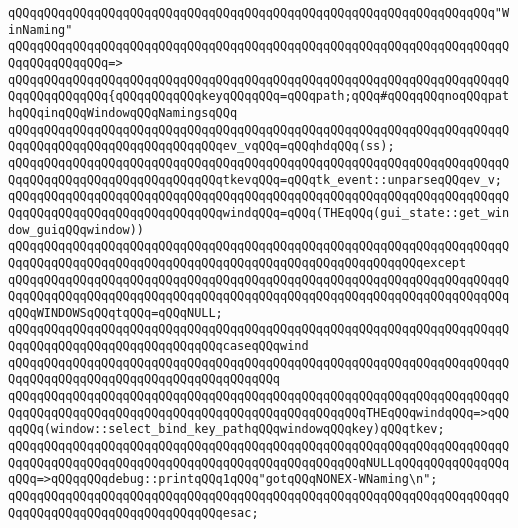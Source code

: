 \newline
\verb|qQQqqQQqqQQqqQQqqQQqqQQqqQQqqQQqqQQqqQQqqQQqqQQqqQQqqQQqqQQqqQQqqQQq"WinNaming"|\newline
\verb|qQQqqQQqqQQqqQQqqQQqqQQqqQQqqQQqqQQqqQQqqQQqqQQqqQQqqQQqqQQqqQQqqQQqqQQqqQQqqQQqqQQq=>|\newline
\verb|qQQqqQQqqQQqqQQqqQQqqQQqqQQqqQQqqQQqqQQqqQQqqQQqqQQqqQQqqQQqqQQqqQQqqQQqqQQqqQQqqQQq{qQQqqQQqqQQqkeyqQQqqQQq=qQQqpath;qQQq#qQQqqQQqnoqQQqpathqQQqinqQQqWindowqQQqNamingsqQQq|\newline
\verb|qQQqqQQqqQQqqQQqqQQqqQQqqQQqqQQqqQQqqQQqqQQqqQQqqQQqqQQqqQQqqQQqqQQqqQQqqQQqqQQqqQQqqQQqqQQqqQQqqQQqev_vqQQq=qQQqhdqQQq(ss);|\newline
\verb|qQQqqQQqqQQqqQQqqQQqqQQqqQQqqQQqqQQqqQQqqQQqqQQqqQQqqQQqqQQqqQQqqQQqqQQqqQQqqQQqqQQqqQQqqQQqqQQqqQQqtkevqQQq=qQQqtk_event::unparseqQQqev_v;|\newline
\newline
\verb|qQQqqQQqqQQqqQQqqQQqqQQqqQQqqQQqqQQqqQQqqQQqqQQqqQQqqQQqqQQqqQQqqQQqqQQqqQQqqQQqqQQqqQQqqQQqqQQqqQQqwindqQQq=qQQq(THEqQQq(gui_state::get_window_guiqQQqwindow))|\newline
\verb|qQQqqQQqqQQqqQQqqQQqqQQqqQQqqQQqqQQqqQQqqQQqqQQqqQQqqQQqqQQqqQQqqQQqqQQqqQQqqQQqqQQqqQQqqQQqqQQqqQQqqQQqqQQqqQQqqQQqqQQqqQQqqQQqexcept|\newline
\verb|qQQqqQQqqQQqqQQqqQQqqQQqqQQqqQQqqQQqqQQqqQQqqQQqqQQqqQQqqQQqqQQqqQQqqQQqqQQqqQQqqQQqqQQqqQQqqQQqqQQqqQQqqQQqqQQqqQQqqQQqqQQqqQQqqQQqqQQqqQQqqQQqWINDOWSqQQqtqQQq=qQQqNULL;|\newline
\newline
\verb|qQQqqQQqqQQqqQQqqQQqqQQqqQQqqQQqqQQqqQQqqQQqqQQqqQQqqQQqqQQqqQQqqQQqqQQqqQQqqQQqqQQqqQQqqQQqqQQqqQQqcaseqQQqwind|\newline
\verb|qQQqqQQqqQQqqQQqqQQqqQQqqQQqqQQqqQQqqQQqqQQqqQQqqQQqqQQqqQQqqQQqqQQqqQQqqQQqqQQqqQQqqQQqqQQqqQQqqQQqqQQqqQQq|\newline
\verb|qQQqqQQqqQQqqQQqqQQqqQQqqQQqqQQqqQQqqQQqqQQqqQQqqQQqqQQqqQQqqQQqqQQqqQQqqQQqqQQqqQQqqQQqqQQqqQQqqQQqqQQqqQQqqQQqqQQqqQQqTHEqQQqwindqQQq=>qQQqqQQq(window::select_bind_key_pathqQQqwindowqQQqkey)qQQqtkev;|\newline
\verb|qQQqqQQqqQQqqQQqqQQqqQQqqQQqqQQqqQQqqQQqqQQqqQQqqQQqqQQqqQQqqQQqqQQqqQQqqQQqqQQqqQQqqQQqqQQqqQQqqQQqqQQqqQQqqQQqqQQqqQQqNULLqQQqqQQqqQQqqQQqqQQq=>qQQqqQQqdebug::printqQQq1qQQq"gotqQQqNONEX-WNaming\n";|\newline
\verb|qQQqqQQqqQQqqQQqqQQqqQQqqQQqqQQqqQQqqQQqqQQqqQQqqQQqqQQqqQQqqQQqqQQqqQQqqQQqqQQqqQQqqQQqqQQqqQQqqQQqesac;|\newline
